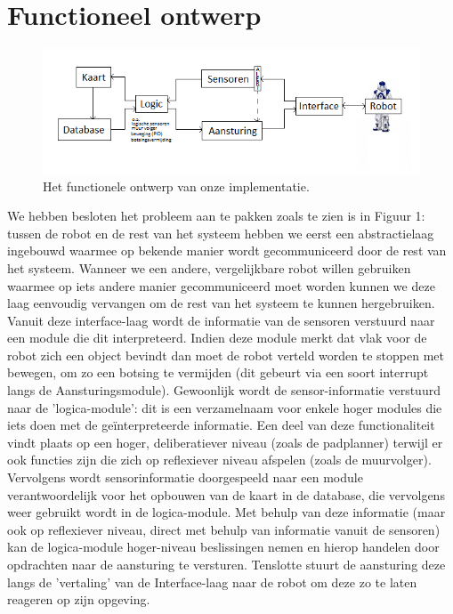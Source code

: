 \documentclass[a4paper, 11pt]{article}
\begin{document}
\clearpage
\section*{Functioneel ontwerp}
  \begin{figure}[h!]
    \centering
      \includegraphics[scale=1]{eenplaatjemetheelduidelijkeuitleg.png}
    \caption{Het functionele ontwerp van onze implementatie.}
  \end{figure}

  We hebben besloten het probleem aan te pakken zoals te zien is in Figuur 1: tussen de robot en de rest van het
  systeem hebben we eerst een abstractielaag ingebouwd waarmee op bekende manier wordt gecommuniceerd door de rest
  van het systeem. Wanneer we een andere, vergelijkbare robot willen gebruiken waarmee op iets andere manier 
  gecommuniceerd moet worden kunnen we deze laag eenvoudig vervangen om de rest van het systeem te kunnen
  hergebruiken. Vanuit deze interface-laag wordt de informatie van de sensoren verstuurd naar een module die dit
  interpreteerd. Indien deze module merkt dat vlak voor de robot zich een object bevindt dan moet de robot 
  verteld worden te stoppen met bewegen, om zo een botsing te vermijden (dit gebeurt via een soort interrupt langs
  de Aansturingsmodule). Gewoonlijk wordt de sensor-informatie verstuurd naar de 'logica-module': dit is een
  verzamelnaam voor enkele hoger modules die iets doen met de ge\"interpreteerde informatie. Een deel van deze
  functionaliteit vindt plaats op een hoger, deliberatiever niveau (zoals de padplanner) terwijl er ook functies zijn
  die zich op reflexiever niveau afspelen (zoals de muurvolger). Vervolgens wordt sensorinformatie doorgespeeld
  naar een module verantwoordelijk voor het opbouwen van de kaart in de database, die vervolgens weer gebruikt
  wordt in de logica-module. Met behulp van deze informatie (maar ook op reflexiever niveau, direct met behulp van 
  informatie vanuit de sensoren) kan de logica-module hoger-niveau beslissingen nemen en hierop handelen door
  opdrachten naar de aansturing te versturen. Tenslotte stuurt de aansturing deze langs de 'vertaling' van de 
  Interface-laag naar de robot om deze zo te laten reageren op zijn opgeving.
  
\end{document}

